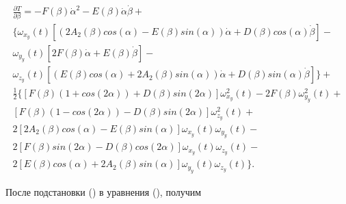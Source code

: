 \begin{equation}%
\label{eq:p3:45}
\begin{multlined}
\frac{ \partial T}{ \partial  \beta }=-F \left(  \beta  \right) \dot \alpha ^{2}-E \left(  \beta  \right)  \dot \alpha \dot \beta +\\ 
\{  
	\omega _{x_{y}} 
		\left( t \right)  \left[  \left( 2A_{2} \left(  \beta  \right) cos \left(  \alpha  \right) -E \left(  \beta  \right) sin \left(  \alpha  \right)  \right)  \dot \alpha +
		D \left(  \beta  \right) cos \left(  \alpha  \right) \dot \beta  \right] - \\
 	\omega _{y_{y}} 
 		\left( t \right)  \left[ 2F \left(  \beta  \right) \dot \alpha +E \left(  \beta  \right) \dot \beta  \right] - \\
 	\omega_{z_{y}} 
 		\left( t \right)  \left[  \left( E \left(  \beta  \right) cos \left(  \alpha  \right) +2A_{2} \left(  \beta  \right) sin \left(  \alpha  \right)  \right) \dot \alpha +
 		D \left(  \beta  \right) sin \left(  \alpha  \right) \dot \beta  \right]  
\} +\\ 
\frac{1}{2} 
\{  
	\left[ 
		F \left(  \beta  \right)  \left( 1+cos \left( 2 \alpha  \right)  \right) +D \left(  \beta  \right) sin \left( 2 \alpha  \right)  \right]  \omega _{x_{y}}^{2} \left( t \right) -2F \left(  \beta  \right)  \omega _{y_{y}}^{2} \left( t \right) + \\ 
	\left[ 
		F \left(  \beta  \right)  \left( 1-cos \left( 2 \alpha  \right)  \right) -D \left(  \beta  \right) sin \left( 2 \alpha  \right)  \right]  \omega _{z_{y}}^{2} \left( t \right) +\\
	2 \left[ 
		2A_{2} \left(  \beta  \right) cos \left(  \alpha  \right) -E \left(  \beta  \right) sin \left(  \alpha  \right)  \right]  \omega _{x_{y}} \left( t \right)  \omega _{y_{y}} \left( t \right) -\\
	2 \left[ 
		F \left(  \beta  \right) sin \left( 2 \alpha  \right) -D \left(  \beta  \right) cos \left( 2 \alpha  \right)  \right]  \omega _{x_{y}} \left( t \right)  \omega _{z_{y}} \left( t \right) -\\
	2 \left[ 
		E \left(  \beta  \right) cos \left(  \alpha  \right) +2A_{2} \left(  \beta  \right) sin \left(  \alpha  \right)  \right]  \omega _{y_{y}} \left( t \right)  \omega _{z_{y}} \left( t \right)  
\} .
\end{multlined}
\end{equation}


После подстановки () в уравнения (), получим


